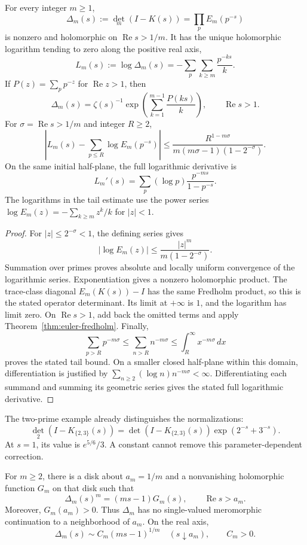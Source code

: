 \begin{theorem}
\label{thm:prime-regularization}
For every integer \(m\geq1\),
\[
 \Delta_m(s):=\det_m(I-K(s))
 =\prod_p E_m(p^{-s})
\]
is nonzero and holomorphic on \(\operatorname{Re}s>1/m\).  It has the
unique holomorphic logarithm tending to zero along the positive real axis,
\[
 L_m(s):=\log \Delta_m(s)
 =-\sum_p\sum_{k\geq m}\frac{p^{-ks}}{k}.
\]
If \(P(z)=\sum_p p^{-z}\) for \(\operatorname{Re}z>1\), then
\[
 \Delta_m(s)=\zeta(s)^{-1}
 \exp\left(\sum_{k=1}^{m-1}\frac{P(ks)}{k}\right),
 \qquad \operatorname{Re}s>1.
\]
For \(\sigma=\operatorname{Re}s>1/m\) and integer \(R\geq2\),
\[
 \left|L_m(s)-\sum_{p\leq R}\log E_m(p^{-s})\right|
 \leq\frac{R^{1-m\sigma}}
 {m(m\sigma-1)(1-2^{-\sigma})}.
\]
On the same initial half-plane, the full logarithmic derivative is
\[
 L_m'(s)=\sum_p(\log p)\frac{p^{-ms}}{1-p^{-s}}.
\]
The logarithms in the tail estimate use the power series
\(\log E_m(z)=-\sum_{k\geq m}z^k/k\) for \(|z|<1\).
\end{theorem}

\begin{proof}
For \(|z|\leq2^{-\sigma}<1\), the defining series gives
\[
 |\log E_m(z)|\leq\frac{|z|^m}{m(1-2^{-\sigma})}.
\]
Summation over primes proves absolute and locally uniform convergence
of the logarithmic series.  Exponentiation gives a nonzero holomorphic
product.  The trace-class diagonal \(E_m(K(s))-I\) has the same Fredholm
product, so this is the stated operator determinant.  Its limit at
\(+\infty\) is \(1\), and the logarithm has limit zero.
On \(\operatorname{Re}s>1\), add back the omitted terms and apply
Theorem~\ref{thm:euler-fredholm}.  Finally,
\[
 \sum_{p>R}p^{-m\sigma}
 \leq\sum_{n>R}n^{-m\sigma}
 \leq\int_R^\infty x^{-m\sigma}\,dx
\]
proves the stated tail bound.  On a smaller closed half-plane within
this domain, differentiation is justified by
\(\sum_{n\geq2}(\log n)n^{-m\sigma}<\infty\).
Differentiating each summand and summing its geometric series gives the
stated full logarithmic derivative.
\end{proof}

The two-prime example already distinguishes the normalizations:
\[
 \det_2(I-K_{\{2,3\}}(s))
 =\det(I-K_{\{2,3\}}(s))\exp(2^{-s}+3^{-s}).
\]
At \(s=1\), its value is \(e^{5/6}/3\).  A constant cannot remove this
parameter-dependent correction.

\begin{theorem}
\label{thm:fractional-zero}
For \(m\geq2\), there is a disk about \(a_m=1/m\) and a nonvanishing
holomorphic function \(G_m\) on that disk such that
\[
 \Delta_m(s)^m=(ms-1)G_m(s),\qquad \operatorname{Re}s>a_m.
\]
Moreover, \(G_m(a_m)>0\).  Thus \(\Delta_m\) has no single-valued meromorphic
continuation to a neighborhood of \(a_m\).  On the real axis,
\[
 \Delta_m(s)\sim C_m(ms-1)^{1/m}\quad(s\downarrow a_m),\qquad C_m>0.
\]
\end{theorem}

